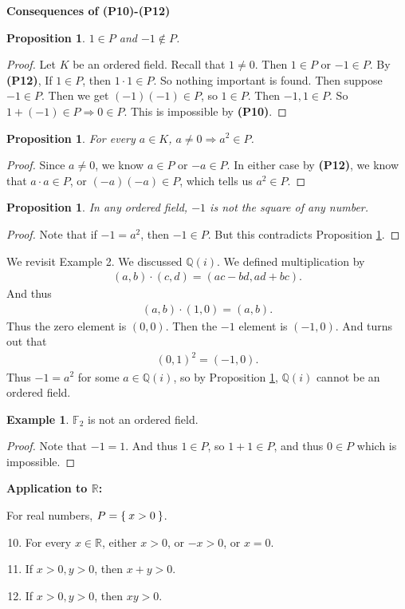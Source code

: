 \documentclass[12pt]{amsbook}
\theoremstyle{plain}
\numberwithin{section}{chapter}
\numberwithin{equation}{chapter}
\newtheorem{Prop}[theorem]{Proposition}
\theoremstyle{definition}
\newtheorem{Ex}[theorem]{Example}
\theoremstyle{remark}
\theoremstyle{plain}
\newcommand{\R}{\mathbb{R}}
\newcommand{\Q}{\mathbb{Q}}
\newcommand{\F}{\mathbb{F}}
\newcommand{\bee}{\begin{equation}\begin{aligned}}
\newcommand{\eee}{\end{aligned}\end{equation}}
\begin{document}
\textbf{Consequences of \textbf{(P10)-(P12)}}

\begin{Prop}\label{ordered1}
$1 \in P$ and $-1 \notin P$. 
\end{Prop}
\begin{proof}
Let $K$ be an ordered field. Recall that $1 \neq 0$. Then $1 \in P$ or $-1 \in P$. By \textbf{(P12)}, If $1 \in P$, then $1 \cdot 1 \in P$. So nothing important is found. Then suppose $-1 \in P$. Then we get $(-1)(-1) \in P$, so $1 \in P$. Then $-1,1 \in P$. So $1 + (-1) \in P \Rightarrow 0 \in P$. This is impossible by \textbf{(P10)}. 
\end{proof}

\begin{Prop}
For every $a \in K$, $a \neq 0 \Rightarrow a^2 \in P$. 
\end{Prop}
\begin{proof}
Since $a \neq 0$, we know $a \in P$ or $-a \in P$. In either case by \textbf{(P12)}, we know that $a \cdot a \in P$, or $(-a)(-a) \in P$, which tells us $a^2 \in P$. 
\end{proof}

\begin{Prop}\label{negonesquared}
In any ordered field, $-1$ is not the square of any number. 
\end{Prop}
\begin{proof}
Note that if $-1 = a^2$, then $-1 \in P$. But this contradicts Proposition \ref{ordered1}. 
\end{proof}

We revisit Example 2. We discussed $\Q(i)$. We defined multiplication by
\bee
(a,b) \cdot (c,d) = (ac - bd, ad + bc).
\eee
And thus
\bee
(a,b) \cdot (1,0) = (a,b). 
\eee
Thus the zero element is $(0,0)$. Then the $-1$ element is $(-1,0)$. And turns out that
\bee
(0,1)^2 = (-1,0). 
\eee
Thus $-1 = a^2$ for some $a \in \Q(i)$, so by Proposition \ref{negonesquared}, $\Q(i)$ cannot be an ordered field. 

\begin{Ex}
$\F_2$ is not an ordered field. 
\end{Ex}
\begin{proof}
Note that $-1 = 1$. And thus $1 \in P$, so $1 + 1 \in P$, and thus $0 \in P$ which is impossible. 
\end{proof}

\textbf{Application to $\R$:}

For real numbers, $P = \Set{x>0}$. 
\begin{enumerate}[label=(\textbf{P\arabic*)}]
\setcounter{enumi}{9}
\item For every $x \in \R$, either $x>0$, or $-x > 0$, or $x = 0$. 
\item If $x > 0,y>0$, then $x + y > 0$.
\item If $x>0,y>0$, then $xy > 0$. 
\end{enumerate}
\end{document}
